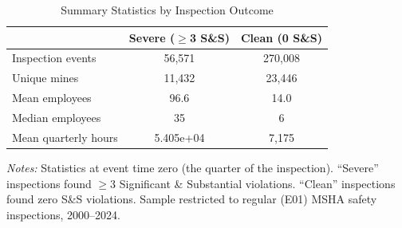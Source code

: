 \begin{table}[htbp]
\centering
\caption{Summary Statistics by Inspection Outcome}
\label{tab:summary}
\begin{tabular}{lcc}
\toprule
 & Severe ($\geq$3 S\&S) & Clean (0 S\&S) \\
\midrule
Inspection events & 56,571 & 270,008 \\
Unique mines & 11,432 & 23,446 \\
Mean employees & 96.6 & 14.0 \\
Median employees & 35 & 6 \\
Mean quarterly hours & 5.405e+04 & 7,175 \\
\bottomrule
\end{tabular}
\begin{tablenotes}[flushleft]\small
\item \textit{Notes:} Statistics at event time zero (the quarter of the inspection). ``Severe'' inspections found $\geq$3 Significant \& Substantial violations. ``Clean'' inspections found zero S\&S violations. Sample restricted to regular (E01) MSHA safety inspections, 2000--2024.
\end{tablenotes}
\end{table}

